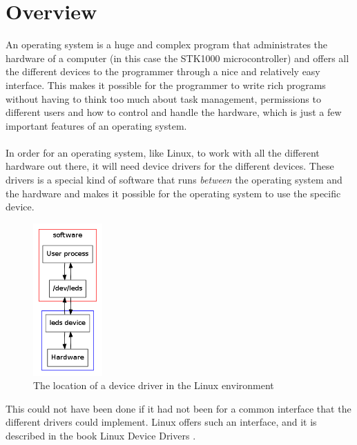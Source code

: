 \section{Overview}
An operating system is a huge and complex program that 
administrates the hardware of a computer (in this case the
STK1000 microcontroller) and offers all the different devices
to the programmer through a nice and relatively easy interface.
This makes it possible for the programmer to write rich
programs without having to think too much about task management,
permissions to different users and how to control and handle
the hardware, which is just a few important features of an
operating system.\\
\\
In order for an operating system, like Linux, 
to work with all the different hardware out there, it will need
device drivers for the different devices. These drivers is a 
special kind of software that runs \textit{between} the operating
system and the hardware and makes it possible
for the operating system to use the specific device.
\begin{figure}[h]
  \centerline{\includegraphics[width=100px]{graphics/device_driver.png}}
  \caption{The location of a device driver in the Linux environment}
  \label{device-driver}
\end{figure}
This could
not have been done if it had not been for a common interface that 
the different drivers could implement. Linux offers such an 
interface, and it is described in the book 
Linux Device Drivers \cite{linux-device-drivers}.\\
\\
